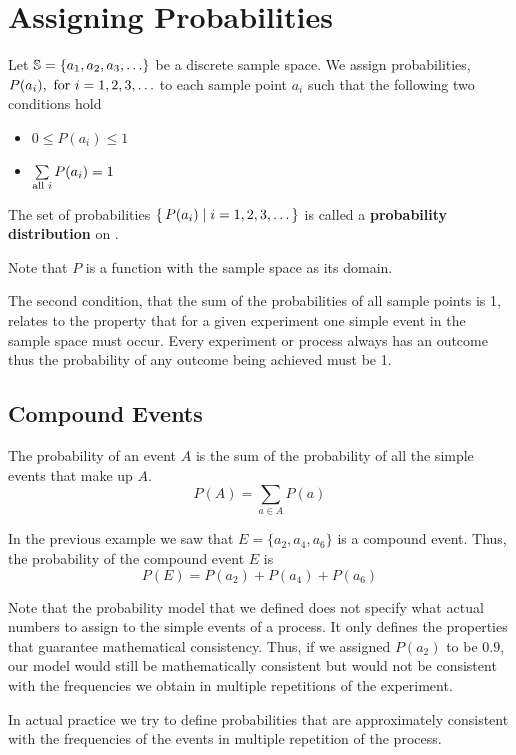 \section{Assigning Probabilities}
Let $\mathbb{S} = \{a_1,a_2,a_3,\ldots\}$ be a discrete sample space. We assign probabilities, $P(a_i),\text{ for } i = 1,2,3,\ldots$ to each sample point $a_i$ such that the following two conditions hold
\begin{itemize}
    \item $0 \leq P(a_i) \leq 1$
    \item $\sum\limits_{\text{all } i} P(a_i) = 1$
\end{itemize}
The set of probabilities $\{\,P(a_i) \mid i = 1,2,3,\ldots\,\}$ is called a \textbf{probability distribution} on \sS.
\begin{info}
Note that $P$ is a function with the sample space as its domain.
\end{info}
The second condition, that the sum of the probabilities of all sample points is 1, relates to the property that for a given experiment one simple event in the sample space must occur. Every experiment or process always has an outcome thus the probability of any outcome being achieved must be 1.
\subsection*{Compound Events}
The probability of an event $A$ is the sum of the probability of all the simple events that make up $A$.
\[
    P(A) = \sum_{a \in A}P(a)
\]
\begin{example}
In the previous example we saw that $E = \{a_2,a_4,a_6\}$ is a compound event. Thus, the probability of the compound event $E$ is
\[
    P(E) = P(a_2) + P(a_4) + P(a_6)
\]
\end{example}
\begin{info}
Note that the probability model that we defined does not specify what actual numbers to assign to the simple events of a process. It only defines the properties that guarantee mathematical consistency. Thus, if we assigned $P(a_2)$ to be $0.9$, our model would still be mathematically consistent but would not be consistent with the frequencies we obtain in multiple repetitions of the experiment.
\end{info}
\begin{info}
In actual practice we try to define probabilities that are approximately consistent with the frequencies of the events in multiple repetition of the process.
\end{info}
